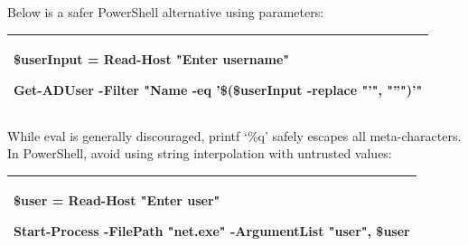 Below is a safer PowerShell alternative using parameters:

\begin{table}
\centering

\begin{tabular}{| l |}
\hline
\$userInput = Read-Host "Enter username"

Get-ADUser -Filter "Name -eq '\$(\$userInput -replace "'", "''")'" \\
\hline

\end{tabular}

\end{table}

While eval is generally discouraged, printf ‘\%q’ safely escapes all meta-characters. In PowerShell, avoid using string interpolation with untrusted values:

\begin{table}
\centering

\begin{tabular}{| l |}
\hline
\$user = Read-Host "Enter user"

Start-Process -FilePath "net.exe" -ArgumentList "user", \$user \\
\hline

\end{tabular}

\end{table}

 
